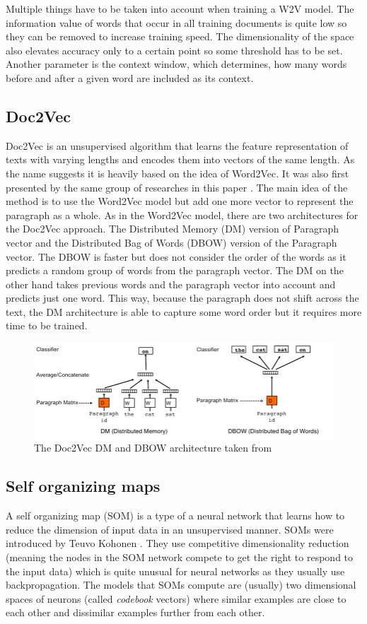 Multiple things have to be taken into account when training a W2V model. The information value of words that occur in all training documents is quite low so they can be removed to increase training speed. The dimensionality of the space also elevates accuracy only to a certain point so some threshold has to be set. Another parameter is the context window, which determines, how many words before and after a given word are included as its context.

\subsection{Doc2Vec}
Doc2Vec is an unsupervised algorithm that learns the feature representation of texts with varying lengths and encodes them into vectors of the same length. As the name suggests it is heavily based on the idea of Word2Vec. It was also first presented by the same group of researches in this paper \cite{DBLP:journals/corr/LeM14}. The main idea of the method is to use the Word2Vec model but add one more vector to represent the paragraph as a whole. As in the Word2Vec model, there are two architectures for the Doc2Vec approach. The Distributed Memory (DM) version of Paragraph vector and the Distributed Bag of Words (DBOW) version of the Paragraph vector. The DBOW is faster but does not consider the order of the words as it predicts a random group of words from the paragraph vector. The DM on the other hand takes previous words and the paragraph vector into account and predicts just one word. This way, because the paragraph does not shift across the text, the DM architecture is able to capture some word order but it requires more time to be trained.
\begin{figure}[h]
    \centering
	\includegraphics[width=140mm]{./img/DV_DBOW_doc2vec_architectures.png}
	\caption{The Doc2Vec DM and DBOW architecture taken from \cite{DBLP:journals/corr/LeM14}}
	\label{fig:dbow_dm_d2v_architecture}
\end{figure}
\subsection{Self organizing maps}
A self organizing map (SOM) is a type of a neural network that learns how to reduce the dimension of input data in an unsupervised manner. SOMs were introduced by Teuvo Kohonen \cite{Kohonen1982}. They use competitive dimensionality reduction (meaning the nodes in the SOM network compete to get the right to respond to the input data) which is quite unusual for neural networks as they usually use backpropagation. The models that SOMs compute are (usually) two dimensional spaces of neurons (called \textit{codebook} vectors) where similar examples are close to each other and dissimilar examples further from each other.

